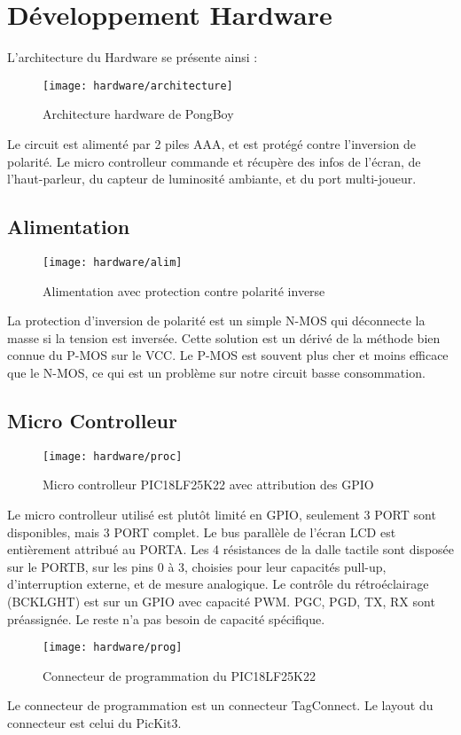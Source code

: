 \section{Développement Hardware}
L'architecture du Hardware se présente ainsi :
\begin{figure}[H]
  \centering
  \texttt{[image: hardware/architecture]}
  \caption{Architecture hardware de PongBoy}
  \label{hard_arc}
\end{figure}
Le circuit est alimenté par 2 piles AAA, et est protégé contre l'inversion
de polarité. Le micro controlleur commande et récupère des infos de l'écran,
de l'haut-parleur, du capteur de luminosité ambiante, et du port multi-joueur.
\newpage

\subsection{Alimentation}
\begin{figure}[H]
  \centering
  \texttt{[image: hardware/alim]}
  \caption{Alimentation avec protection contre polarité inverse}
  \label{hard_pow}
\end{figure}
La protection d'inversion de polarité est un simple N-MOS qui déconnecte
la masse si la tension est inversée. Cette solution est un dérivé de la méthode
bien connue du P-MOS sur le VCC. Le P-MOS est souvent plus cher et moins
efficace que le N-MOS, ce qui est un problème sur notre circuit basse
consommation.
\newpage

\subsection{Micro Controlleur}
\begin{figure}[H]
  \centering
  \texttt{[image: hardware/proc]}
  \caption{Micro controlleur PIC18LF25K22 avec attribution des GPIO}
  \label{hard_proc}
\end{figure}
Le micro controlleur utilisé est plutôt limité en GPIO, seulement 3 PORT sont
disponibles, mais 3 PORT complet.
Le bus parallèle de l'écran LCD est entièrement attribué au PORTA.
Les 4 résistances de la dalle tactile sont disposée sur le PORTB, sur les pins
0 à 3, choisies pour leur capacités pull-up, d'interruption externe,
et de mesure analogique.
Le contrôle du rétroéclairage (BCKLGHT) est sur un GPIO avec capacité PWM.
PGC, PGD, TX, RX sont préassignée. Le reste n'a pas besoin de capacité
spécifique.

\begin{figure}[H]
  \centering
  \texttt{[image: hardware/prog]}
  \caption{Connecteur de programmation du PIC18LF25K22}
  \label{hard_prog}
\end{figure}
Le connecteur de programmation est un connecteur TagConnect. Le layout
du connecteur est celui du PicKit3.
\newpage

